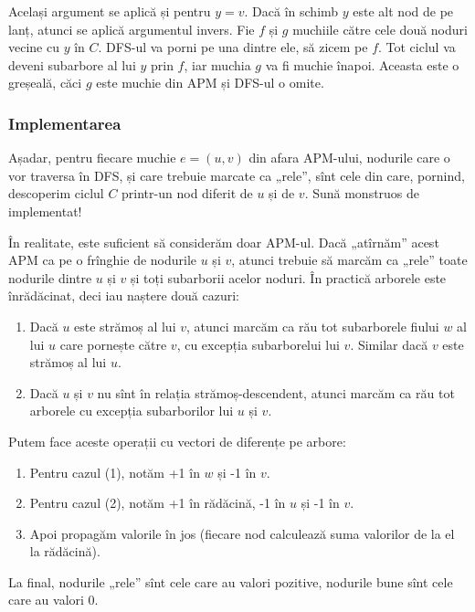 \documentclass[../main.tex]{subfiles}
\begin{document}
Același argument se aplică și pentru $y=v$. Dacă în schimb $y$ este alt nod de pe lanț, atunci se aplică argumentul invers. Fie $f$ și $g$ muchiile către cele două noduri vecine cu $y$ în $C$. DFS-ul va porni pe una dintre ele, să zicem pe $f$. Tot ciclul va deveni subarbore al lui $y$ prin $f$, iar muchia $g$ va fi muchie înapoi. Aceasta este o greșeală, căci $g$ este muchie din APM și DFS-ul o omite.

\subsubsection*{Implementarea}

Așadar, pentru fiecare muchie $e=(u,v)$ din afara APM-ului, nodurile care o vor traversa în DFS, și care trebuie marcate ca „rele”, sînt cele din care, pornind, descoperim ciclul $C$ printr-un nod diferit de $u$ și de $v$. Sună monstruos de implementat! 

În realitate, este suficient să considerăm doar APM-ul. Dacă „atîrnăm” acest APM ca pe o frînghie de nodurile $u$ și $v$, atunci trebuie să marcăm ca „rele” toate nodurile dintre $u$ și $v$ și toți subarborii acelor noduri. În practică arborele este înrădăcinat, deci iau naștere două cazuri:

\begin{enumerate}
  \item Dacă $u$ este strămoș al lui $v$, atunci marcăm ca rău tot subarborele fiului $w$ al lui $u$ care pornește către $v$, cu excepția subarborelui lui $v$. Similar dacă $v$ este strămoș al lui $u$.

  \item Dacă $u$ și $v$ nu sînt în relația strămoș-descendent, atunci marcăm ca rău tot arborele cu excepția subarborilor lui $u$ și $v$.
\end{enumerate}

Putem face aceste operații cu vectori de diferențe pe arbore:

\begin{enumerate}
  \item Pentru cazul (1), notăm +1 în $w$ și -1 în $v$.
  \item Pentru cazul (2), notăm +1 în rădăcină, -1 în $u$ și -1 în $v$.
  \item Apoi propagăm valorile în jos (fiecare nod calculează suma valorilor de la el la rădăcină).
\end{enumerate}

La final, nodurile „rele” sînt cele care au valori pozitive, nodurile bune sînt cele care au valori 0.
\end{document}
